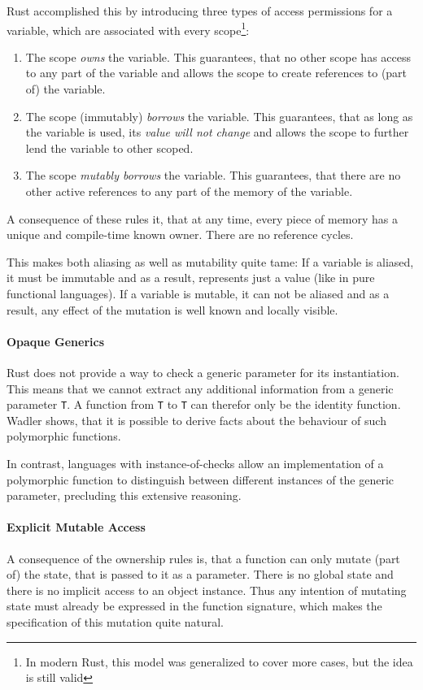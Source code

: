 \documentclass{book}
\newcommand{\code}[1]{\texttt{#1}}
\theoremstyle{definition}
\begin{document}
Rust accomplished this by introducing three types of access permissions for a variable, which are associated with every scope\footnote{In modern Rust, this model was generalized to cover more cases, but the idea is still valid}:
\begin{enumerate}
  \item The scope \textit{owns} the variable. This guarantees, that no other scope has access to any part of the variable and allows the scope to create references to (part of) the variable.
  \item The scope (immutably) \textit{borrows} the variable. This guarantees, that as long as the variable is used, its \textit{value will not change} and allows the scope to further lend the variable to other scoped.
  \item The scope \textit{mutably borrows} the variable. This guarantees, that there are no other active references to any part of the memory of the variable.
\end{enumerate}

A consequence of these rules it, that at any time, every piece of memory has a unique and compile-time known owner. There are no reference cycles.

This makes both aliasing as well as mutability quite tame:
If a variable is aliased, it must be immutable and as a result, represents just a value (like in pure functional languages).
If a variable is mutable, it can not be aliased and as a result, any effect of the mutation is well known and locally visible.

\paragraph*{Opaque Generics} Rust does not provide a way to check a generic parameter for its instantiation. This means that we cannot extract any additional information from a generic parameter \code{T}. A function from \code{T} to \code{T} can therefor only be the identity function.
Wadler \cite{wadler_theorems_1989} shows, that it is possible to derive facts about the behaviour of such polymorphic functions.

In contrast, languages with instance-of-checks allow an implementation of a polymorphic function to distinguish between different instances of the generic parameter, precluding this extensive reasoning.

\paragraph*{Explicit Mutable Access} A consequence of the ownership rules is, that a function can only mutate (part of) the state, that is passed to it as a parameter. There is no global state and there is no implicit access to an object instance. Thus any intention of mutating state must already be expressed in the function signature, which makes the specification of this mutation quite natural.
\end{document}
